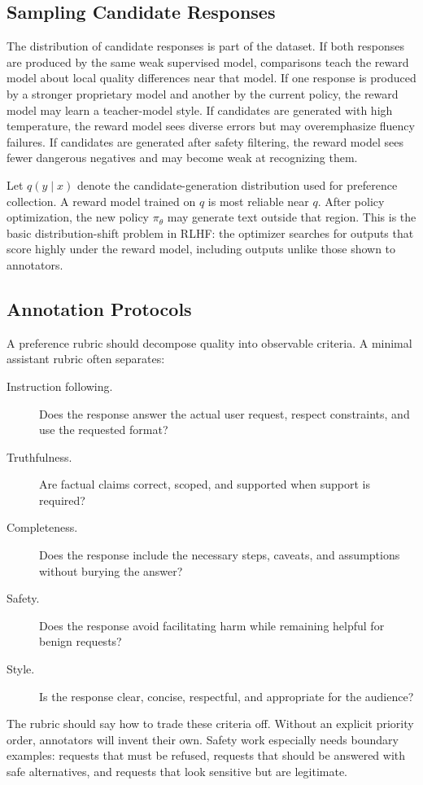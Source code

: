 \subsection{Sampling Candidate Responses}
The distribution of candidate responses is part of the dataset. If both responses are produced by the same weak supervised model, comparisons teach the reward model about local quality differences near that model. If one response is produced by a stronger proprietary model and another by the current policy, the reward model may learn a teacher-model style. If candidates are generated with high temperature, the reward model sees diverse errors but may overemphasize fluency failures. If candidates are generated after safety filtering, the reward model sees fewer dangerous negatives and may become weak at recognizing them.

Let $q(y \mid x)$ denote the candidate-generation distribution used for preference collection. A reward model trained on $q$ is most reliable near $q$. After policy optimization, the new policy $\pi_\theta$ may generate text outside that region. This is the basic distribution-shift problem in RLHF: the optimizer searches for outputs that score highly under the reward model, including outputs unlike those shown to annotators.

\subsection{Annotation Protocols}
A preference rubric should decompose quality into observable criteria. A minimal assistant rubric often separates:
\begin{description}
    \item[Instruction following.] Does the response answer the actual user request, respect constraints, and use the requested format?
    \item[Truthfulness.] Are factual claims correct, scoped, and supported when support is required?
    \item[Completeness.] Does the response include the necessary steps, caveats, and assumptions without burying the answer?
    \item[Safety.] Does the response avoid facilitating harm while remaining helpful for benign requests?
    \item[Style.] Is the response clear, concise, respectful, and appropriate for the audience?
\end{description}
The rubric should say how to trade these criteria off. Without an explicit priority order, annotators will invent their own. Safety work especially needs boundary examples: requests that must be refused, requests that should be answered with safe alternatives, and requests that look sensitive but are legitimate.

